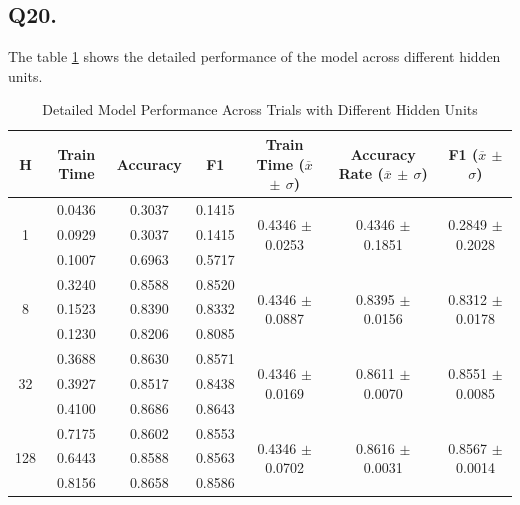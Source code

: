 \documentclass{article}
\begin{document}
\subsection*{Q20.}

The table \ref{tab:detailed_model_performance} shows the detailed performance of the model across different hidden units.

\begin{table}[htbp]
    \centering
    \begin{tabular}{ccccccc}
    \toprule
    H &  Train Time & Accuracy & F1 & Train Time ($\overline{x}$ $\pm$ $\sigma$) & Accuracy Rate ($\overline{x}$ $\pm$ $\sigma$)& F1 ($\overline{x}$ $\pm$ $\sigma$)\\
    \midrule
    \multirow{3}{*}{1} & 0.0436 & 0.3037 & 0.1415 & \multirow{3}{*}{0.4346 $\pm$ 0.0253} & \multirow{3}{*}{0.4346 $\pm$ 0.1851} & \multirow{3}{*}{0.2849 $\pm$ 0.2028} \\
                       & 0.0929 & 0.3037 & 0.1415 & & \\
                       & 0.1007 & 0.6963 & 0.5717 & & \\
    \midrule
    \multirow{3}{*}{8} & 0.3240 & 0.8588 & 0.8520 & \multirow{3}{*}{0.4346 $\pm$ 0.0887} & \multirow{3}{*}{0.8395 $\pm$ 0.0156} & \multirow{3}{*}{0.8312 $\pm$ 0.0178} \\
                       & 0.1523 & 0.8390 & 0.8332 & & \\
                       & 0.1230 & 0.8206 & 0.8085 & & \\
    \midrule
    \multirow{3}{*}{32} & 0.3688 & 0.8630 & 0.8571 & \multirow{3}{*}{0.4346 $\pm$ 0.0169} & \multirow{3}{*}{0.8611 $\pm$ 0.0070} & \multirow{3}{*}{0.8551 $\pm$ 0.0085} \\
                        & 0.3927 & 0.8517 & 0.8438 & & \\
                        & 0.4100 & 0.8686 & 0.8643 & & \\
    \midrule
    \multirow{3}{*}{128} & 0.7175 & 0.8602 & 0.8553 & \multirow{3}{*}{0.4346 $\pm$ 0.0702} & \multirow{3}{*}{0.8616 $\pm$ 0.0031} & \multirow{3}{*}{0.8567 $\pm$ 0.0014} \\
                         & 0.6443 & 0.8588 & 0.8563 & & \\
                         & 0.8156 & 0.8658 & 0.8586 & & \\
    \bottomrule
    \end{tabular}
    \caption{Detailed Model Performance Across Trials with Different Hidden Units}
    \label{tab:detailed_model_performance}
\end{table}
    
\end{document}
